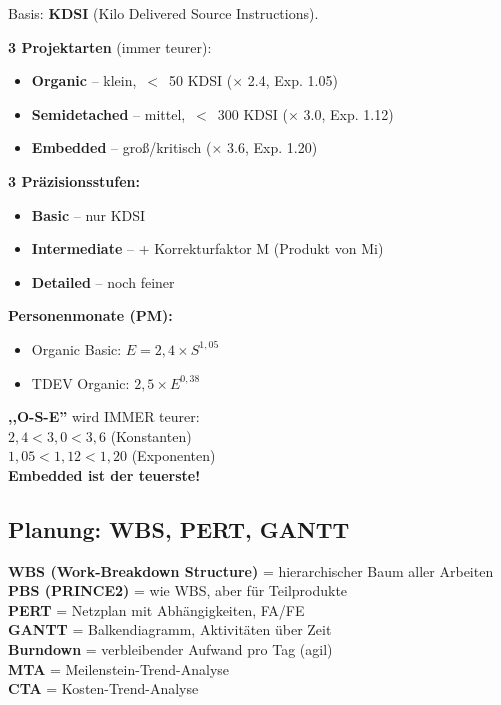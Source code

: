 \documentclass[11pt,a4paper]{article}
\begin{document}
\begin{keyfacts}
Basis: \textbf{KDSI} (Kilo Delivered Source Instructions).

\textbf{3 Projektarten} (immer teurer):
\begin{itemize}
  \item \textbf{Organic} -- klein, \,$<$\, 50 KDSI ($\times$ 2.4, Exp. 1.05)
  \item \textbf{Semidetached} -- mittel, \,$<$\, 300 KDSI ($\times$ 3.0, Exp. 1.12)
  \item \textbf{Embedded} -- groß/kritisch ($\times$ 3.6, Exp. 1.20)
\end{itemize}

\textbf{3 Präzisionsstufen:}
\begin{itemize}
  \item \textbf{Basic} -- nur KDSI
  \item \textbf{Intermediate} -- + Korrekturfaktor M (Produkt von Mi)
  \item \textbf{Detailed} -- noch feiner
\end{itemize}

\textbf{Personenmonate (PM):}
\begin{itemize}
  \item Organic Basic: $E = 2{,}4 \times S^{1{,}05}$
  \item TDEV Organic: $2{,}5 \times E^{0{,}38}$
\end{itemize}
\end{keyfacts}

\begin{merkhilfe}
\textbf{,,O-S-E''} wird IMMER teurer:\\
$2{,}4 < 3{,}0 < 3{,}6$ (Konstanten)\\
$1{,}05 < 1{,}12 < 1{,}20$ (Exponenten)\\
\textbf{Embedded ist der teuerste!}
\end{merkhilfe}

\subsection{Planung: WBS, PERT, GANTT}

\begin{keyfacts}
\textbf{WBS (Work-Breakdown Structure)} = hierarchischer Baum aller Arbeiten\\
\textbf{PBS (PRINCE2)} = wie WBS, aber für Teilprodukte\\
\textbf{PERT} = Netzplan mit Abhängigkeiten, FA/FE\\
\textbf{GANTT} = Balkendiagramm, Aktivitäten über Zeit\\
\textbf{Burndown} = verbleibender Aufwand pro Tag (agil)\\
\textbf{MTA} = Meilenstein-Trend-Analyse\\
\textbf{CTA} = Kosten-Trend-Analyse
\end{keyfacts}
\end{document}

